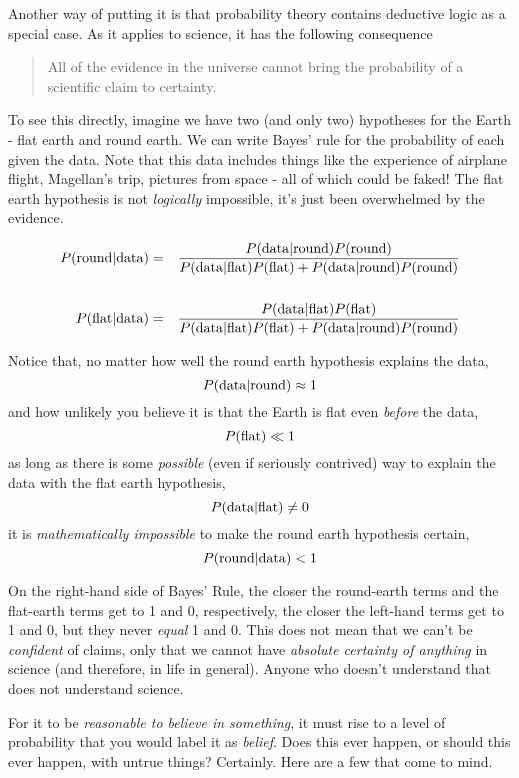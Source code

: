 Another way of putting it is that probability theory contains deductive logic as a special case.  As it applies to science, it has the following consequence

\begin{quote}
All of the evidence in the universe cannot bring the probability of a
scientific claim to certainty.
\end{quote}

To see this directly, imagine we have two (and only two) hypotheses for
the Earth - flat earth and round earth. We can write Bayes' rule for the
probability of each given the data. Note that this data includes things
like the experience of airplane flight, Magellan's trip, pictures from
space - all of which could be faked! The flat earth hypothesis is not
\emph{logically} impossible, it's just been overwhelmed by the evidence.

\begin{eqnarray*}
P({\rm round}|{\rm data}) &=& \frac{P({\rm data}|{\rm round})P({\rm round})}{P({\rm data}|{\rm flat})P({\rm flat})+P({\rm data}|{\rm round})P({\rm round})}\\\\
P({\rm flat}|{\rm data}) &=& \frac{P({\rm data}|{\rm flat})P({\rm flat})}{P({\rm data}|{\rm flat})P({\rm flat})+P({\rm data}|{\rm round})P({\rm round})} 
\end{eqnarray*}

Notice that, no matter how well the round earth hypothesis explains the
data, \[P({\rm data}|{\rm round})\approx 1\] and how unlikely you
believe it is that the Earth is flat even \emph{before} the data,
\[P({\rm flat})\ll 1\] as long as there is some \emph{possible} (even if
seriously contrived) way to explain the data with the flat earth
hypothesis, \[P({\rm data}|{\rm flat}) \neq 0\] it is
\emph{mathematically impossible} to make the round earth hypothesis
certain, \[P({\rm round}|{\rm data})< 1\]

On the right-hand side of Bayes' Rule, the closer the round-earth terms
and the flat-earth terms get to 1 and 0, respectively, the closer the
left-hand terms get to 1 and 0, but they never \emph{equal} 1 and 0.
This does not mean that we can't be \emph{confident} of claims, only
that we cannot have \emph{absolute certainty of anything} in science
(and therefore, in life in general). Anyone who doesn't understand that
does not understand science.

For it to be {\em reasonable to believe in something}, it must rise to a level of probability that you would label it as {\em belief}.  Does this ever happen, or should this ever happen, with untrue things?  Certainly.  Here are a few that come to mind.


